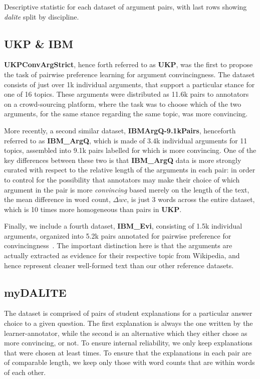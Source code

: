 \documentclass[runningheads]{llncs}
\begin{document}
\begin{table}
	\caption{Descriptive statistic for each dataset of argument pairs, with 
		last rows showing \textit{dalite} split by discipline.}
	\centerline{}
	\label{tab:data_summary}
\end{table}


\subsection{UKP \& IBM}
\textbf{UKPConvArgStrict}\cite{habernal_which_2016}, hence forth referred to as 
\textbf{UKP}, was the first to propose the task of pairwise preference learning 
for argument convincingness. 
The dataset consists of just over 1k individual arguments, that support a 
particular stance for one of 16 topics. 
These arguments were distributed as 11.6k pairs to annotators on a 
crowd-sourcing platform, where the task was to choose which of the two 
arguments, for the same stance regarding the same topic, was more convincing. 

More recently, a second similar dataset, 
\textbf{IBMArgQ-9.1kPairs}\cite{toledo_automatic_2019}, henceforth 
referred to as \textbf{IBM\_ArgQ}, which is made of 3.4k individual arguments 
for 11 topics, assembled into 9.1k pairs labelled for which is more convincing. 
One of the key differences between these two is that \textbf{IBM\_ArgQ} data is 
more strongly curated with respect to the relative length of the arguments in 
each pair: in order to control for the possibility that annotators may make 
their choice of which argument in the pair is more \textit{convincing} based 
merely on the length of the text, the mean difference in word count, 
$\overline{\Delta wc}$, is just 3 words across the entire dataset, which is 10 
times more homogeneous than pairs in \textbf{UKP}.

Finally, we include a fourth dataset, \textbf{IBM\_Evi}, consisting of 1.5k 
individual arguments, organized into 5.2k pairs annotated for pairwise 
preference for convincingness~\cite{gleize_are_2019}. The important distinction 
here is that the arguments are actually extracted as evidence for their 
respective topic from Wikipedia, and hence represent cleaner well-formed text 
than our other reference datasets.



\subsection{myDALITE}
The dataset is comprised of pairs of student explanations for a particular 
answer choice to a given question. 
The first explanation is always the one written by the learner-annotator, while 
the second is an alternative which they either chose as more convincing, or 
not. 
To ensure internal reliability, we only keep explanations that were chosen at 
least times. 
To ensure that the explanations in each pair are of comparable length, we keep 
only those with word counts that are within 
words of each other. 
\end{document}
